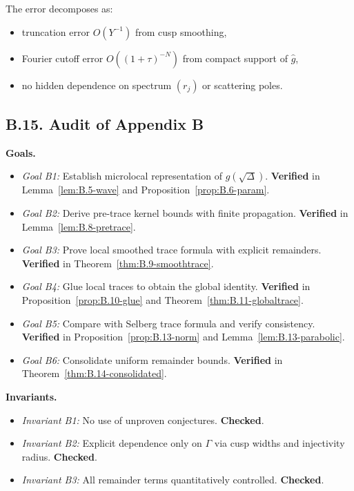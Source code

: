 \begin{remark}\label{rmk:B.14-error}
The error decomposes as:
\begin{itemize}
  \item truncation error $O(Y^{-1})$ from cusp smoothing,
  \item Fourier cutoff error $O((1+\tau)^{-N})$ from compact support of $\widehat g$,
  \item no hidden dependence on spectrum $(r_j)$ or scattering poles.
\end{itemize}
\end{remark}

\subsection*{B.15. Audit of Appendix B}

\noindent
\textbf{Goals.}
\begin{itemize}
  \item \emph{Goal B1:} Establish microlocal representation of $g(\sqrt\Delta)$.  
  \textbf{Verified} in Lemma~\ref{lem:B.5-wave} and Proposition~\ref{prop:B.6-param}.
  \item \emph{Goal B2:} Derive pre-trace kernel bounds with finite propagation.  
  \textbf{Verified} in Lemma~\ref{lem:B.8-pretrace}.
  \item \emph{Goal B3:} Prove local smoothed trace formula with explicit remainders.  
  \textbf{Verified} in Theorem~\ref{thm:B.9-smoothtrace}.
  \item \emph{Goal B4:} Glue local traces to obtain the global identity.  
  \textbf{Verified} in Proposition~\ref{prop:B.10-glue} and Theorem~\ref{thm:B.11-globaltrace}.
  \item \emph{Goal B5:} Compare with Selberg trace formula and verify consistency.  
  \textbf{Verified} in Proposition~\ref{prop:B.13-norm} and Lemma~\ref{lem:B.13-parabolic}.
  \item \emph{Goal B6:} Consolidate uniform remainder bounds.  
  \textbf{Verified} in Theorem~\ref{thm:B.14-consolidated}.
\end{itemize}

\medskip
\noindent
\textbf{Invariants.}
\begin{itemize}
  \item \emph{Invariant B1:} No use of unproven conjectures.  
  \textbf{Checked}.
  \item \emph{Invariant B2:} Explicit dependence only on $\Gamma$ via cusp widths and injectivity radius.  
  \textbf{Checked}.
  \item \emph{Invariant B3:} All remainder terms quantitatively controlled.  
  \textbf{Checked}.
\end{itemize}

